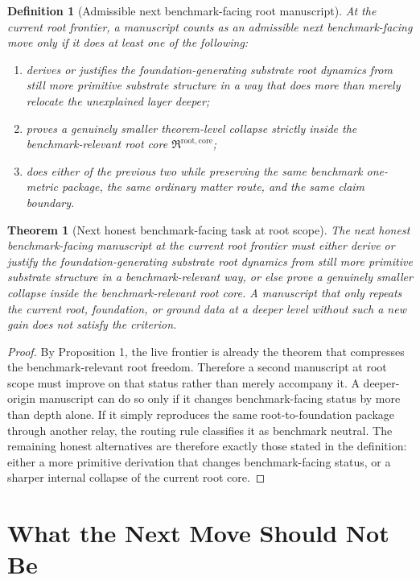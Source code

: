 \documentclass[11pt]{article}
\newcommand{\RootCore}{\mathfrak R^{\mathrm{root,core}}}
\newtheorem{definition}{Definition}
\newtheorem{theorem}{Theorem}
\begin{document}
\begin{definition}[Admissible next benchmark-facing root manuscript]
At the current root frontier, a manuscript counts as an admissible next benchmark-facing move only if it does at least one of the following:
\begin{enumerate}
    \item derives or justifies the foundation-generating substrate root dynamics from still more primitive substrate structure in a way that does more than merely relocate the unexplained layer deeper;
    \item proves a genuinely smaller theorem-level collapse strictly inside the benchmark-relevant root core \(\RootCore\);
    \item does either of the previous two while preserving the same benchmark one-metric package, the same ordinary matter route, and the same claim boundary.
\end{enumerate}
\end{definition}

\begin{theorem}[Next honest benchmark-facing task at root scope]
The next honest benchmark-facing manuscript at the current root frontier must either derive or justify the foundation-generating substrate root dynamics from still more primitive substrate structure in a benchmark-relevant way, or else prove a genuinely smaller collapse inside the benchmark-relevant root core. A manuscript that only repeats the current root, foundation, or ground data at a deeper level without such a new gain does not satisfy the criterion.
\end{theorem}

\begin{proof}
By Proposition 1, the live frontier is already the theorem that compresses the benchmark-relevant root freedom. Therefore a second manuscript at root scope must improve on that status rather than merely accompany it. A deeper-origin manuscript can do so only if it changes benchmark-facing status by more than depth alone. If it simply reproduces the same root-to-foundation package through another relay, the routing rule classifies it as benchmark neutral. The remaining honest alternatives are therefore exactly those stated in the definition: either a more primitive derivation that changes benchmark-facing status, or a sharper internal collapse of the current root core.
\end{proof}

\section{What the Next Move Should Not Be}
\end{document}
